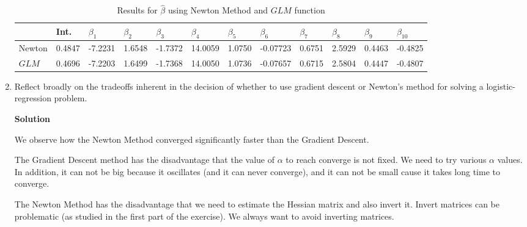 \documentclass[11 pt]{article}
\begin{document}
\begin{enumerate}[label=(\Alph*)]
\begin{table}[H]
	\small 
	\centering
	\caption{Results for $\hat\beta$ using Newton Method and $GLM$ function}
	\label{my-label}
	\begin{tabular}{@{}llllllllllll@{}}
		\toprule
		& Int. & $\beta_1$ & $\beta_2$  & $\beta_3$  & $\beta_4$  & $\beta_5$  & $\beta_6$  & $\beta_7$  & $\beta_8$  & $\beta_9$  & $\beta_{10}$ \\ \midrule
		Newton & 	0.4847 & -7.2231 & 1.6548 & -1.7372 & 14.0059 & 1.0750 & -0.07723 & 0.6751 & 2.5929 &0.4463 & -0.4825    \\
		$GLM$  & 0.4696 & -7.2203 & 1.6499 & -1.7368 & 14.0050 & 1.0736 & -0.07657 & 0.6715 & 2.5804 & 0.4447 & -0.4807  \\ \bottomrule
	\end{tabular}
\end{table}



\newpage
\item Reflect broadly on the tradeoffs inherent in the decision of whether to use gradient descent or Newton's method for solving a logistic-regression problem.

\vspace{2mm}
\textbf{Solution}

We observe how the Newton Method converged significantly faster than the Gradient Descent. 

The Gradient Descent method has the disadvantage that the value of $\alpha$ to reach converge is not fixed. We need to try various $\alpha$ values. In addition, it can not be big because it oscillates (and it can never converge), and it can not be small cause it takes long time to converge. 

The Newton Method has the disadvantage that we need to estimate the Hessian matrix and also invert it. Invert matrices can be problematic (as studied in the first part of the exercise). We always want to avoid inverting matrices.




\end{enumerate}

\newpage


\end{document}
